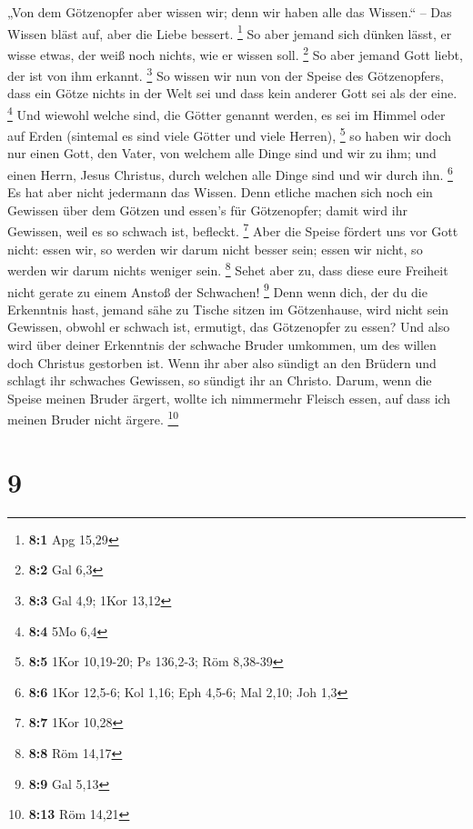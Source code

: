  „Von dem Götzenopfer aber wissen wir; denn wir haben alle
das Wissen.`` -- Das Wissen bläst auf, aber die Liebe bessert.
\footnote{\textbf{8:1} Apg 15,29}  So aber jemand sich
dünken lässt, er wisse etwas, der weiß noch nichts, wie er wissen soll.
\footnote{\textbf{8:2} Gal 6,3}  So aber jemand Gott
liebt, der ist von ihm erkannt. \footnote{\textbf{8:3} Gal 4,9; 1Kor
  13,12}  So wissen wir nun von der Speise des
Götzenopfers, dass ein Götze nichts in der Welt sei und dass kein
anderer Gott sei als der eine. \footnote{\textbf{8:4} 5Mo 6,4}
 Und wiewohl welche sind, die Götter genannt werden, es
sei im Himmel oder auf Erden (sintemal es sind viele Götter und viele
Herren), \footnote{\textbf{8:5} 1Kor 10,19-20; Ps 136,2-3; Röm 8,38-39}
 so haben wir doch nur einen Gott, den Vater, von welchem
alle Dinge sind und wir zu ihm; und einen Herrn, Jesus Christus, durch
welchen alle Dinge sind und wir durch ihn. \footnote{\textbf{8:6} 1Kor
  12,5-6; Kol 1,16; Eph 4,5-6; Mal 2,10; Joh 1,3}  Es hat
aber nicht jedermann das Wissen. Denn etliche machen sich noch ein
Gewissen über dem Götzen und essen's für Götzenopfer; damit wird ihr
Gewissen, weil es so schwach ist, befleckt. \footnote{\textbf{8:7} 1Kor
  10,28}  Aber die Speise fördert uns vor Gott nicht:
essen wir, so werden wir darum nicht besser sein; essen wir nicht, so
werden wir darum nichts weniger sein. \footnote{\textbf{8:8} Röm 14,17}
 Sehet aber zu, dass diese eure Freiheit nicht gerate zu
einem Anstoß der Schwachen! \footnote{\textbf{8:9} Gal 5,13}
 Denn wenn dich, der du die Erkenntnis hast, jemand sähe
zu Tische sitzen im Götzenhause, wird nicht sein Gewissen, obwohl er
schwach ist, ermutigt, das Götzenopfer zu essen?  Und
also wird über deiner Erkenntnis der schwache Bruder umkommen, um des
willen doch Christus gestorben ist.  Wenn ihr aber also
sündigt an den Brüdern und schlagt ihr schwaches Gewissen, so sündigt
ihr an Christo.  Darum, wenn die Speise meinen Bruder
ärgert, wollte ich nimmermehr Fleisch essen, auf dass ich meinen Bruder
nicht ärgere. \footnote{\textbf{8:13} Röm 14,21}

\hypertarget{section-8}{%
\section{9}\label{section-8}}

